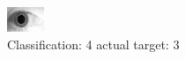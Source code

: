 \begin{figure}[h!]
\begin{center}
\includegraphics[width=0.60\columnwidth]{figures/ID1938_class_4_target_3.png}
\end{center}
\caption{ Classification: 4 actual target: 3}
\label{fig:ID1938_class_4_target_3}
\end{figure}
